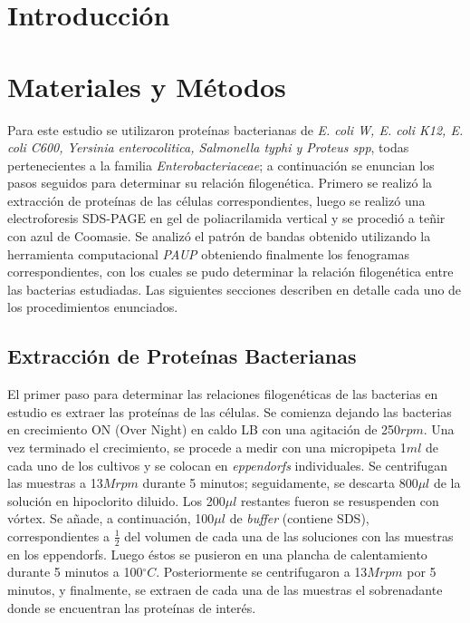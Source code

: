 \documentclass[%
 reprint,
 amsmath,amssymb,
 aps,
showkeys,
letter,
12pts
]{revtex4-1}
\begin{document}
\maketitle


\section{\label{sec:Intro}Introducción}


\section{\label{sec:MyM}Materiales y Métodos} %
	Para este estudio se utilizaron proteínas bacterianas de \textit{E. coli W, E. coli K12, E. coli C600, Yersinia enterocolitica, Salmonella typhi y Proteus spp},  todas pertenecientes a la familia \textit{Enterobacteriaceae}; a continuación se enuncian los pasos seguidos para determinar su relación filogenética.
	Primero se realizó la extracción de proteínas de las células correspondientes, luego se realizó una electroforesis SDS-PAGE en gel de poliacrilamida vertical y se procedió a teñir con azul de Coomasie. Se analizó el patrón de bandas obtenido utilizando la herramienta computacional \textit{PAUP} obteniendo finalmente los fenogramas correspondientes, con los cuales se pudo determinar la relación filogenética entre las bacterias estudiadas. Las siguientes secciones describen en detalle cada uno de los procedimientos enunciados.
	
	\subsection{\label{sec:ExtraMet}Extracción de Proteínas Bacterianas}
		El primer paso para determinar las relaciones filogenéticas de las bacterias en estudio es extraer las proteínas de las células.
		Se comienza dejando las bacterias en crecimiento ON (Over Night) en caldo LB con una agitación de 250$rpm$. Una vez terminado el crecimiento, se procede a medir con una micropipeta 1$ml$ de cada uno de los cultivos y se colocan en \textit{eppendorfs} individuales. Se centrifugan las muestras a 13$Mrpm$ durante 5 minutos; seguidamente, se descarta 800$\mu l$ de la solución en hipoclorito diluido. Los 200$\mu l$ restantes fueron se resuspenden con vórtex. Se añade, a continuación, 100$\mu l$ de \textit{buffer} (contiene SDS), correspondientes a $\frac{1}{2}$ del volumen de cada una de las soluciones con las muestras en los eppendorfs. Luego éstos se pusieron en una plancha de calentamiento durante 5 minutos a 100$^{\circ}C$. Posteriormente se centrifugaron a 13$Mrpm$ por 5 minutos, y finalmente, se extraen de cada una de las muestras el sobrenadante donde se encuentran las proteínas de interés.
		
\end{document}
